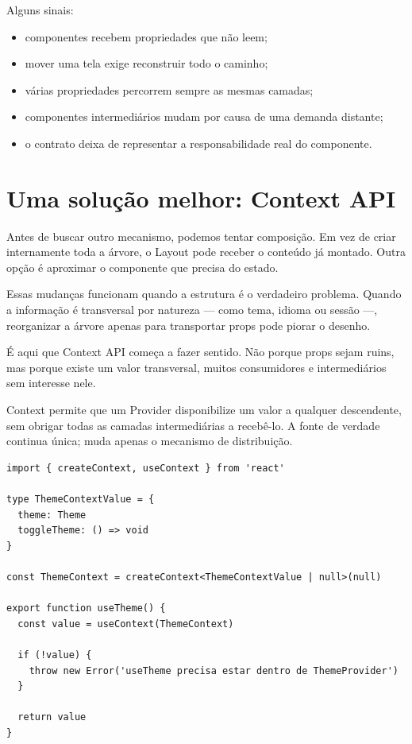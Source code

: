 Alguns sinais:

\begin{itemize}
  \item componentes recebem propriedades que não leem;
  \item mover uma tela exige reconstruir todo o caminho;
  \item várias propriedades percorrem sempre as mesmas camadas;
  \item componentes intermediários mudam por causa de uma demanda distante;
  \item o contrato deixa de representar a responsabilidade real do componente.
\end{itemize}

\section{Uma solução melhor: Context API}

Antes de buscar outro mecanismo, podemos tentar composição. Em vez de
 criar internamente toda a árvore, o Layout pode receber o
conteúdo já montado. Outra opção é aproximar o componente que precisa do estado.

Essas mudanças funcionam quando a estrutura é o verdadeiro problema. Quando a
informação é transversal por natureza --- como tema, idioma ou sessão ---,
reorganizar a árvore apenas para transportar props pode piorar o desenho.

É aqui que Context API começa a fazer sentido. Não porque props sejam ruins, mas
porque existe um valor transversal, muitos consumidores e intermediários sem
interesse nele.

Context permite que um Provider disponibilize um valor a qualquer descendente,
sem obrigar todas as camadas intermediárias a recebê-lo. A fonte de verdade
continua única; muda apenas o mecanismo de distribuição.

\begin{lstlisting}[caption={O contexto descreve o contrato compartilhado.}]
import { createContext, useContext } from 'react'

type ThemeContextValue = {
  theme: Theme
  toggleTheme: () => void
}

const ThemeContext = createContext<ThemeContextValue | null>(null)

export function useTheme() {
  const value = useContext(ThemeContext)

  if (!value) {
    throw new Error('useTheme precisa estar dentro de ThemeProvider')
  }

  return value
}
\end{lstlisting}

